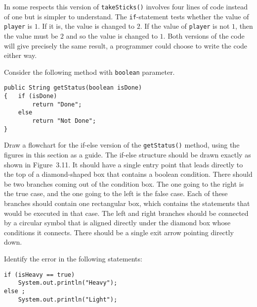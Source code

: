 \noindent In some respects this version of {\tt takeSticks()}
involves four lines of code instead of one but is simpler
to understand. The {\tt if}-statement tests whether the value of {\tt player}
is $1$.  If it is, the value is changed to $2$.  If the value of {\tt player}
is not $1$, then the value must be $2$ and so the value is changed to $1$.
Both versions of the code will give precisely the same result, a programmer
could choose to write the code either way.


\begin{SSTUDY}

\item  Consider the following method with
{\tt boolean} parameter.

\begin{jjjlisting}
\begin{lstlisting}
public String getStatus(boolean isDone)
{   if (isDone)
        return "Done";
    else
        return "Not Done";
}
\end{lstlisting}
\end{jjjlisting}

\noindent Draw a flowchart for the if-else version of the
{\tt getStatus()} method, using the figures in this section as a
guide.  The if-else structure should be drawn exactly as shown in
Figure~3.11. It should have a single entry point that leads directly
to the top of a diamond-shaped box that contains a boolean condition.
There should be two branches coming out of the condition box.  The one
going to the right is the true case, and the one going to the left is
the false case.  Each of these branches should contain one rectangular
box, which contains the statements that would be executed in that
case.  The left and right branches should be connected by a circular
symbol that is aligned directly under the diamond box whose conditions
it connects.  There should be a single exit arrow pointing directly
down.


\item  Identify the error in the following statements:

\begin{jjjlisting}
\begin{lstlisting}
if (isHeavy == true)
    System.out.println("Heavy");
else ;
    System.out.println("Light");


\end{lstlisting}
\end{jjjlisting}
\end{SSTUDY}
